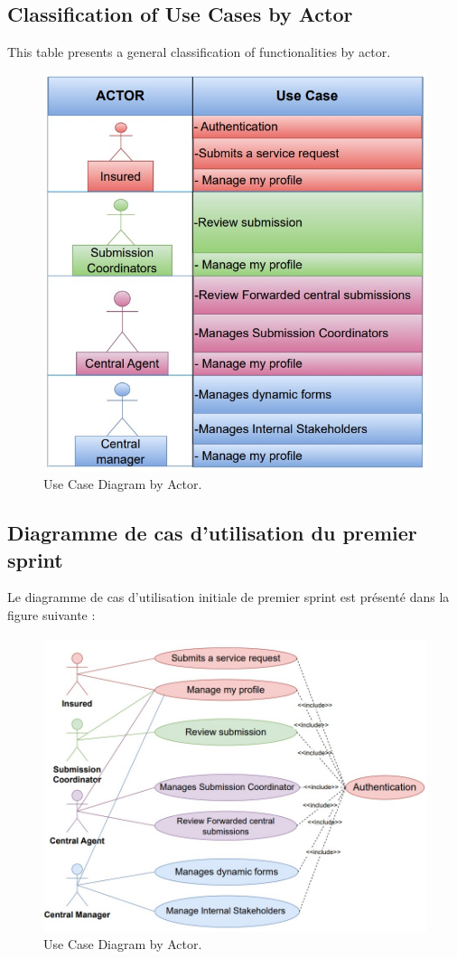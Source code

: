 \subsection{Classification of Use Cases by Actor}
This table presents a general classification of functionalities by actor.
\begin{figure}[h]
    \centering
    \includegraphics[width=1\textwidth]{figures/use case par acteur.png}
    \caption{Use Case Diagram by Actor.}
\end{figure}
\clearpage
\subsection{Diagramme de cas d’utilisation du premier sprint}
Le diagramme de cas d’utilisation initiale de premier sprint est présenté dans la figure suivante :
\begin{figure}[h]
    \centering
    \includegraphics[width=1\textwidth]{figures/sprint1 use case.png}
    \caption{Use Case Diagram by Actor.}
\end{figure}
\clearpage
